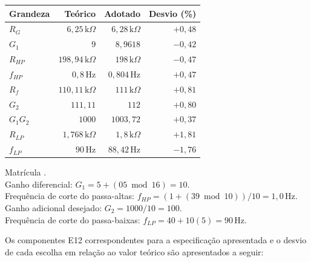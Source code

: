 \documentclass[11pt,a4paper]{article}
\begin{document}
\begin{center}
\begin{tabular}{@{}lrrr@{}}
\toprule
\textbf{Grandeza} & \textbf{Teórico} & \textbf{Adotado} &
\textbf{Desvio (\%)} \\
\midrule
\(R_G\) & \(6{,}25\,\text{k}\Omega\) &
\(6{,}28\,\text{k}\Omega\) & \(+0{,}48\) \\
\(G_1\) & \(9\) & \(8{,}9618\) & \(-0{,}42\) \\
\(R_{HP}\) & \(198{,}94\,\text{k}\Omega\) &
\(198\,\text{k}\Omega\) & \(-0{,}47\) \\
\(f_{HP}\) & \(0{,}8\,\text{Hz}\) &
\(0{,}804\,\text{Hz}\) & \(+0{,}47\) \\
\(R_f\) & \(110{,}11\,\text{k}\Omega\) &
\(111\,\text{k}\Omega\) & \(+0{,}81\) \\
\(G_2\) & \(111{,}11\) & \(112\) & \(+0{,}80\) \\
\(G_1G_2\) & \(1000\) & \(1003{,}72\) & \(+0{,}37\) \\
\(R_{LP}\) & \(1{,}768\,\text{k}\Omega\) &
\(1{,}8\,\text{k}\Omega\) & \(+1{,}81\) \\
\(f_{LP}\) & \(90\,\text{Hz}\) &
\(88{,}42\,\text{Hz}\) & \(-1{,}76\) \\
\bottomrule
\end{tabular}
\end{center}

\begin{espec}
Matrícula . \\
Ganho diferencial: \(G_1=5+(05\bmod 16)=10\). \\
Frequência de corte do passa-altas: \(f_{HP}=(1+(39\bmod 10))/10=1{,}0\,\text{Hz}\). \\
Ganho adicional desejado: \(G_2=1000/10=100\). \\
Frequência de corte do passa-baixas: \(f_{LP}=40+10(5)=90\,\text{Hz}\).
\end{espec}

Os componentes E12 correspondentes para a especificação apresentada e o desvio de cada escolha em relação ao valor teórico são apresentados a seguir:
\end{document}

